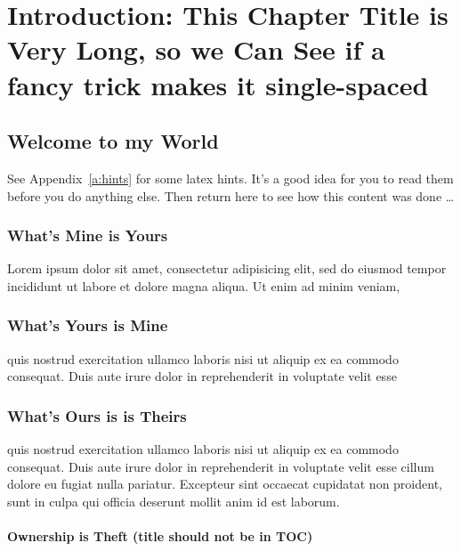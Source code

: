 \chapter[\label{c:intro}\protect\vspace{-1.3ex}Introduction: This Chapter Title
is Very Long, so we Can See\\ if a fancy trick makes it
single-spaced]{Introduction: This Chapter Title is Very Long, so we Can See if
a fancy trick makes it single-spaced}

\section{Welcome to my World}

See Appendix~\ref{a:hints} for some latex hints.  It's a good idea for
you to read them before you do anything else.  Then return here to see
how this content was done \dots


\subsection{What's Mine is Yours}

Lorem ipsum dolor sit amet, consectetur adipisicing elit, sed do eiusmod tempor incididunt ut labore et dolore magna aliqua. Ut enim ad minim veniam,

\subsection{What's Yours is Mine}


quis nostrud exercitation ullamco laboris nisi ut aliquip ex ea commodo consequat. Duis aute irure dolor in reprehenderit in voluptate velit esse



\subsection{What's Ours is is Theirs}

quis nostrud exercitation ullamco laboris nisi ut aliquip ex ea commodo consequat. Duis aute irure dolor in reprehenderit in voluptate velit esse
cillum dolore eu fugiat nulla pariatur. Excepteur sint occaecat cupidatat non proident, sunt in culpa qui officia deserunt mollit anim id est
laborum.

\subsubsection{Ownership is Theft (title should not be in TOC)}

